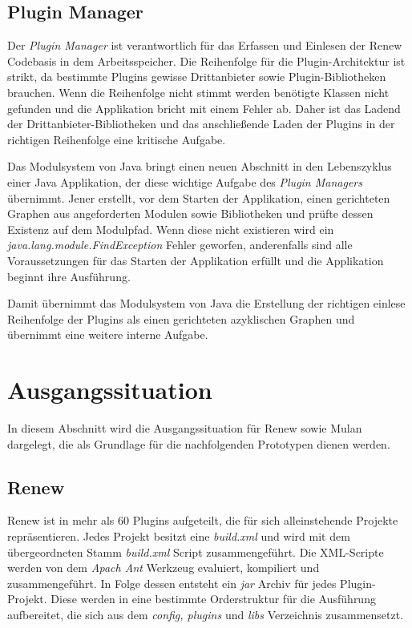 \subsection{Plugin Manager}
	Der \textit{Plugin Manager} ist verantwortlich für das Erfassen und Einlesen der Renew Codebasis in dem Arbeitsspeicher. Die Reihenfolge für die Plugin-Architektur ist strikt, da bestimmte Plugins gewisse Drittanbieter sowie Plugin-Bibliotheken brauchen. Wenn die Reihenfolge nicht stimmt werden benötigte Klassen nicht gefunden und die Applikation bricht mit einem Fehler ab. Daher ist das Ladend der Drittanbieter-Bibliotheken und das anschließende Laden der Plugins in der richtigen Reihenfolge eine kritische Aufgabe. \bigbreak

	Das Modulsystem von Java bringt einen neuen Abschnitt in den Lebenszyklus einer Java Applikation, der diese wichtige Aufgabe des \textit{Plugin Managers} übernimmt. Jener erstellt, vor dem Starten der Applikation, einen gerichteten Graphen aus angeforderten Modulen sowie Bibliotheken und prüfte dessen Existenz auf dem Modulpfad. Wenn diese nicht existieren wird ein \textit{java.lang.module.FindException} Fehler geworfen, anderenfalls sind alle Voraussetzungen für das Starten der Applikation erfüllt und die Applikation beginnt ihre Ausführung. \bigbreak

	Damit übernimmt das Modulsystem von Java die Erstellung der richtigen einlese Reihenfolge der Plugins als einen gerichteten azyklischen Graphen und übernimmt eine weitere interne Aufgabe.

\section{Ausgangssituation} \label{sec:ausgangssituation} 
	In diesem Abschnitt wird die Ausgangssituation für Renew sowie Mulan dargelegt, die als Grundlage für die nachfolgenden Prototypen dienen werden. 

\subsection{Renew} \label{sub:renew}
	Renew ist in mehr als 60 Plugins aufgeteilt, die für sich alleinstehende Projekte repräsentieren. Jedes Projekt besitzt eine \textit{build.xml} und wird mit dem übergeordneten Stamm \textit{build.xml} Script zusammengeführt. Die XML-Scripte werden von dem \textit{Apach Ant} Werkzeug evaluiert, kompiliert und zusammengeführt. In Folge dessen entsteht ein \textit{jar} Archiv für jedes Plugin-Projekt. Diese werden in eine bestimmte Orderstruktur für die Ausführung aufbereitet, die sich aus dem \textit{config, plugins} und \textit{libs} Verzeichnis zusammensetzt. \bigbreak

